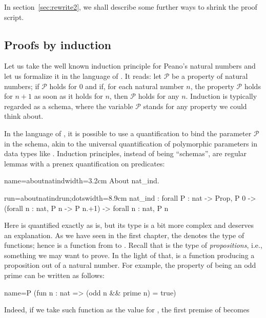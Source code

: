 In section~\ref{sec:rewrite2}, we shall describe some further
ways to shrink the proof script.

\subsection{Proofs by induction}\label{ssec:ind}

Let us take the well known induction principle for Peano's natural numbers
and let us formalize it in the language of \Coq{}.  It reads:
let $\mathcal{P}$ be a property of natural numbers; if
$\mathcal{P}$ holds for $0$ and if, for each natural number $n$, the
property
$\mathcal{P}$ holds for $n + 1$ as soon as it holds for $n$, then $\mathcal{P}$
holds for any $n$.  Induction is typically regarded as a schema, where
the variable $\mathcal{P}$ stands for any property we could think about.

In the language of \Coq{}, it is possible to use a quantification to
bind the parameter  $\mathcal{P}$ in the schema, akin to the universal
quantification of polymorphic parameters in data types like
. Induction principles, instead of being ``schemas'', are
regular lemmas with a prenex quantification on predicates:

\begin{coq-left}{name=aboutnatind}{width=3.2cm}
About nat_ind.
$~$
$~$
\end{coq-left}
\begin{coqout-right}{run=aboutnatindrun;dots}{width=8.9cm}
nat_ind : forall P : nat -> Prop,
  P 0 -> (forall n : nat, P n -> P n.+1) ->
  forall n : nat, P n
\end{coqout-right}

Here  is quantified exactly as  is, but its type is a bit more
complex and deserves an explanation.  As we have seen in the first
chapter, the \C{->} denotes the type of functions; hence  is a
function from  to .  Recall that  is the type
of \emph{propositions}, i.e., something we may want to prove.  In the
light of that,  is a function producing a proposition out of a natural
number.  For example, the property of being an odd prime can be written as
follows:

\begin{coq}{name=P}{}
(fun n : nat => (odd n && prime n) = true)
\end{coq}
Indeed, if we take such function as the value for , the first premise
of  becomes

